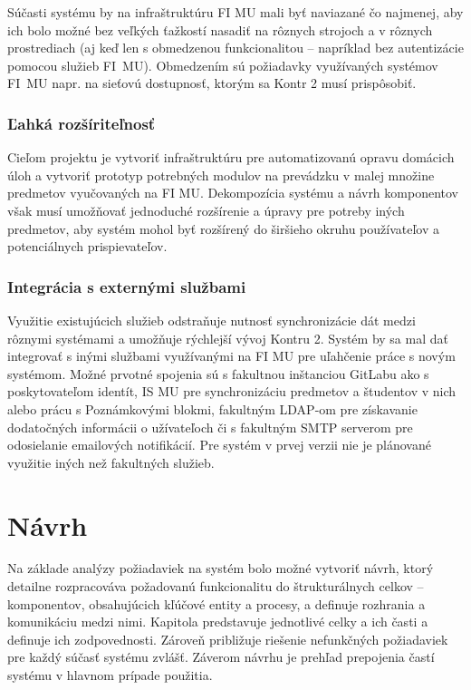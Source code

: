 \documentclass[
  digital, %
  twoside, %
  table,   %
  lof,     %
  lot,     %
]{fithesis3}
\begin{document}
Súčasti systému by na infraštruktúru FI MU mali byť naviazané čo najmenej, aby ich bolo možné bez veľkých ťažkostí nasadiť na rôznych strojoch a v rôznych prostrediach (aj keď len s obmedzenou funkcionalitou -- napríklad bez autentizácie pomocou služieb FI~MU). Obmedzením sú požiadavky využívaných systémov FI~MU napr. na sieťovú dostupnosť, ktorým sa Kontr 2 musí prispôsobiť.

\subsection{Ľahká rozšíriteľnosť}

Cieľom projektu je vytvoriť infraštruktúru pre automatizovanú opravu domácich úloh a vytvoriť prototyp potrebných modulov na prevádzku v malej množine predmetov vyučovaných na FI MU. Dekompozícia systému a návrh komponentov však musí umožňovať jednoduché rozšírenie a úpravy pre potreby iných predmetov, aby systém mohol byť rozšírený do širšieho okruhu používateľov a potenciálnych prispievateľov.

\subsection{Integrácia s externými službami}
Využitie existujúcich služieb odstraňuje nutnosť synchronizácie dát medzi rôznymi systémami a umožňuje rýchlejší vývoj Kontru 2. Systém by sa mal dať integrovať s inými službami využívanými na FI MU pre uľahčenie práce s novým systémom. Možné prvotné spojenia sú s fakultnou inštanciou GitLabu ako s poskytovateľom identít, IS MU pre synchronizáciu predmetov a študentov v nich alebo prácu s Poznámkovými blokmi, fakultným LDAP-om pre získavanie dodatočných informácii o užívateľoch či s fakultným SMTP serverom pre odosielanie emailových notifikácií. Pre systém v prvej verzii nie je plánované využitie iných než fakultných služieb.

\chapter{Návrh}
Na základe analýzy požiadaviek na systém bolo možné vytvoriť návrh, ktorý detailne rozpracováva požadovanú funkcionalitu do štrukturálnych celkov -- komponentov, obsahujúcich kľúčové entity a procesy, a definuje rozhrania a komunikáciu medzi nimi. Kapitola predstavuje jednotlivé celky a ich časti a definuje ich zodpovednosti. Zároveň približuje riešenie nefunkčných požiadaviek pre každý súčasť systému zvlášť. Záverom návrhu je prehľad prepojenia častí systému v hlavnom prípade použitia. 
\end{document}
